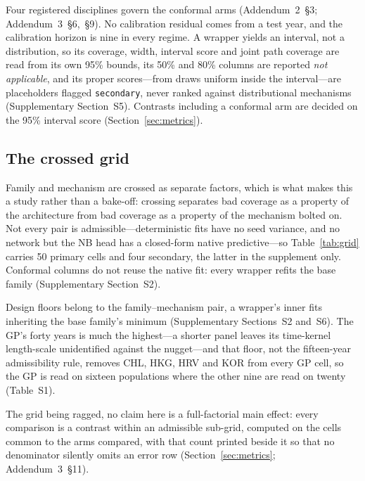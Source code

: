 Four registered disciplines govern the conformal arms (Addendum~2~\S3;
Addendum~3~\S6,~\S9). No calibration residual comes from a test year, and the
calibration horizon is nine in every regime. A wrapper yields an interval, not a
distribution, so its coverage, width, interval score and joint path coverage are
read from its own 95\% bounds, its 50\% and 80\% columns are reported \emph{not
applicable}, and its proper scores---from draws uniform inside the
interval---are placeholders flagged \texttt{secondary}, never ranked against
distributional mechanisms (Supplementary Section~S5). Contrasts including a
conformal arm are decided on the 95\% interval score
(Section~\ref{sec:metrics}).

\subsection{The crossed grid}
\label{sec:design-grid}

Family and mechanism are crossed as separate factors, which is what makes this a
study rather than a bake-off: crossing separates bad coverage as a property of
the architecture from bad coverage as a property of the mechanism bolted on. Not
every pair is admissible---deterministic fits have no seed variance, and no
network but the NB head has a closed-form native predictive---so
Table~\ref{tab:grid} carries 50 primary cells and four secondary, the latter in
the supplement only. Conformal columns do not reuse the native fit: every
wrapper refits the base family (Supplementary Section~S2).

\begin{table}[htbp]\centering
\caption{Admissible model-family $\times$ uncertainty-mechanism grid, transcribed
from the pre-registration.}
\label{tab:grid}
\end{table}

Design floors belong to the family--mechanism pair, a wrapper's inner fits
inheriting the base family's minimum (Supplementary Sections~S2 and~S6). The
GP's forty years is much the highest---a shorter panel leaves its time-kernel
length-scale unidentified against the nugget---and that floor, not the
fifteen-year admissibility rule, removes CHL, HKG, HRV and KOR from every GP
cell, so the GP is read on sixteen populations where the other nine are read on
twenty (Table~S1).

The grid being ragged, no claim here is a full-factorial main effect: every
comparison is a contrast within an admissible sub-grid, computed on the cells
common to the arms compared, with that count printed beside it so that no
denominator silently omits an error row (Section~\ref{sec:metrics};
Addendum~3~\S11).

